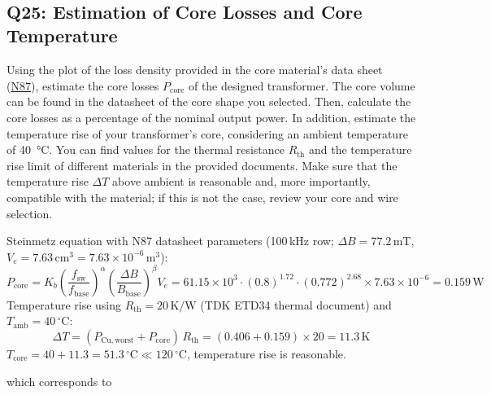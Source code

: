 \documentclass{PELsmallreport}
\begin{document}
\hfill{}\\





\subsection{Q25: Estimation of Core Losses and Core Temperature} 
Using the plot of the loss density provided in the core material's data sheet (\href{https://www.tdk-electronics.tdk.com/download/528882/990c299b916e9f3eb7e44ad563b7f0b9/pdf-n87.pdf}{N87}), estimate the core losses $P_\mathrm{core}$ of the designed transformer. 
The core volume can be found in the datasheet of the core shape you selected. 
Then, calculate the core losses as a percentage of the nominal output power.
In addition, estimate the temperature rise of your transformer's core, considering an ambient temperature of \qty{40}{\celsius}. 
You can find values for the thermal resistance $R_\mathrm{th}$ and the temperature rise limit of different materials in the provided documents. 
Make sure that the temperature rise $\Delta T$ above ambient is reasonable and, more importantly, compatible with the material; if this is not the case, review your core and wire selection.


\begin{framed}
	\vspace{2em}
	Steinmetz equation with N87 datasheet parameters (100\,kHz row; $\Delta B = 77.2\,\mathrm{mT}$, $V_e = 7.63\,\mathrm{cm}^3 = 7.63\!\times\!10^{-6}\,\mathrm{m}^3$):
\begin{equation}
    P_\mathrm{core} = K_b\!\left(\frac{f_\mathrm{sw}}{f_\mathrm{base}}\right)^\alpha\!\left(\frac{\Delta B}{B_\mathrm{base}}\right)^\beta\!V_e= 61.15\!\times\!10^3\cdot(0.8)^{1.72}\cdot(0.772)^{2.68}\times7.63\!\times\!10^{-6} = 0.159\,\mathrm{W}
\end{equation}
Temperature rise using $R_\mathrm{th}=20\,\mathrm{K/W}$ (TDK ETD34 thermal document) and $T_\mathrm{amb}=40\,^\circ\mathrm{C}$:
\begin{equation}
    \Delta T = (P_\mathrm{Cu,worst}+P_\mathrm{core})\,R_\mathrm{th} = (0.406+0.159)\times20 = 11.3\,\mathrm{K}
\end{equation}
$T_\mathrm{core} = 40+11.3 = 51.3\,^\circ\mathrm{C} \ll 120\,^\circ\mathrm{C}$, temperature rise is reasonable.
	\vspace{2em}
\end{framed}

 which corresponds to  \\  \hfill{}
\end{document}
